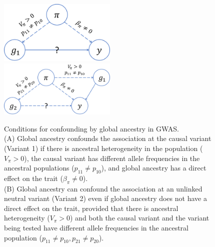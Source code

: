 \documentclass[12pt]{article}
\begin{document}
\begin{figure}
\includegraphics[width=0.5\textwidth]{figs/confounding_dags/dag_gwas_1_v2.png}
\includegraphics[width=0.5\textwidth]{figs/confounding_dags/dag_gwas_2_v2.png}
\caption{Conditions for confounding by global ancestry in GWAS. \\(A) Global ancestry confounds the association at the causal variant (Variant 1) if there is ancestral heterogeneity in the population ($V_\pi > 0$), the causal variant has different allele frequencies in the ancestral populations ($p_{11} \neq p_{10}$), and global ancestry has a direct effect on the trait ($\beta_\pi \neq 0$). \\(B) Global ancestry can confound the association at an unlinked neutral variant (Variant 2) even if global ancestry does not have a direct effect on the trait, provided that there is ancestral heterogeneity ($V_\pi > 0$) and both the causal variant and the variant being tested have different allele frequencies in the ancestral population ($p_{11} \neq p_{10}, p_{21} \neq p_{20}$).}
\label{fig:confoundingdags}
\end{figure}
\end{document}
